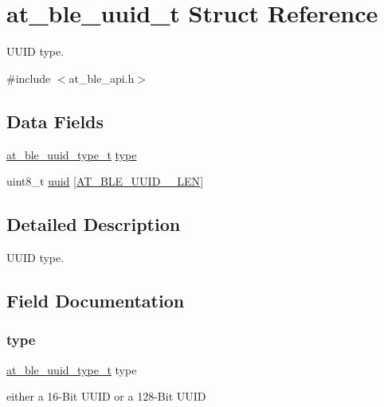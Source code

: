 \hypertarget{structat__ble__uuid__t}{}\section{at\+\_\+ble\+\_\+uuid\+\_\+t Struct Reference}
\label{structat__ble__uuid__t}


U\+U\+ID type.  




{\ttfamily \#include $<$at\+\_\+ble\+\_\+api.\+h$>$}

\subsection*{Data Fields}
\begin{DoxyCompactItemize}
\item 
\mbox{\hyperlink{at__ble__api_8h_aa10a83fc4ef29b62dce06c08609f9934}{at\+\_\+ble\+\_\+uuid\+\_\+type\+\_\+t}} \mbox{\hyperlink{structat__ble__uuid__t_aef29e54873e9256c8d870e439451f375}{type}}
\item 
uint8\+\_\+t \mbox{\hyperlink{structat__ble__uuid__t_a28075b2f9d7ed13d7627ba6c0ac113b7}{uuid}} \mbox{[}\mbox{\hyperlink{at__ble__api_8h_ad457cb8348d6bef04d1c280f172415bf}{A\+T\+\_\+\+B\+L\+E\+\_\+\+U\+U\+I\+D\+\_\+\_\+\+L\+EN}}\mbox{]}
\end{DoxyCompactItemize}


\subsection{Detailed Description}
U\+U\+ID type. 

\subsection{Field Documentation}
\mbox{\label{structat__ble__uuid__t_aef29e54873e9256c8d870e439451f375}} 
\subsubsection{\texorpdfstring{type}{type}}
{\footnotesize\ttfamily \mbox{\hyperlink{at__ble__api_8h_aa10a83fc4ef29b62dce06c08609f9934}{at\+\_\+ble\+\_\+uuid\+\_\+type\+\_\+t}} type}

either a 16-\/Bit U\+U\+ID or a 128-\/Bit U\+U\+ID \mbox{\label{structat__ble__uuid__t_a28075b2f9d7ed13d7627ba6c0ac113b7}} 
